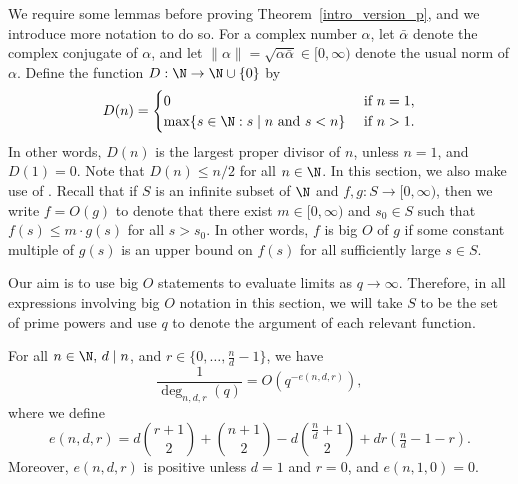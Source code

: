 We require some lemmas before proving Theorem~\ref{intro_version_p}, and we introduce more notation to do so.
For a complex number \(\alpha\), let \(\bar{\alpha}\) denote the complex conjugate of \(\alpha\), and let \(\| \alpha \| = \sqrt{\alpha \bar{\alpha}} \in [0,\infty)\) denote the usual norm of \(\alpha\).
Define the function \(D : \N \to \N \cup \{0\}\) by
\begin{equation}
D(n) =
\begin{cases}
0 & \text{ if } n = 1, \\
\max \{ s \in \N : s \mid n \text{ and } s < n\} & \text{ if } n > 1.
\end{cases}
\end{equation}
In other words, \(D(n)\) is the largest proper divisor of \(n\), unless \(n = 1\), and \(D(1) = 0\).
Note that \(D(n) \leq n/2\) for all \(n \in \N\).
In this section, we also make use of .
Recall that if \(S\) is an infinite subset of \(\N\) and \(f,g : S \to [0,\infty)\), then we write \(f = O(g)\) to denote that there exist \(m \in [0,\infty)\) and \(s_0 \in S\) such that \(f(s) \leq m \cdot g(s)\) for all \(s > s_0\).
In other words, \(f\) is big \(O\) of \(g\) if some constant multiple of \(g(s)\) is an upper bound on \(f(s)\) for all sufficiently large \(s \in S\).

\begin{remark}
	Our aim is to use big \(O\) statements to evaluate limits as \(q \to \infty\).
	Therefore, in all expressions involving big \(O\) notation in this section, we will take \(S\) to be the set of prime powers and use \(q\) to denote the argument of each relevant function.
\end{remark}


\begin{lemma}
\label{degree_limit_lemma}
For all \(n \in \N, \, d \mid n\), and \(r \in \{0,\ldots,\tfrac{n}{d}-1\}\), we have
\begin{equation}
\frac{1}{\deg_{n,d,r} (q)}
=
O \left (
q^{-e(n,d,r)}
\right ),
\end{equation}
where we define
\begin{equation}
\label{definition_of_e}
e(n,d,r)
=
d\binom{r+1}{2} + \binom{n+1}{2} - d\binom{\tfrac{n}{d} + 1}{2} + dr\left ( \tfrac{n}{d}-1-r \right ).
\end{equation}
Moreover, \(e(n,d,r)\) is positive unless \(d = 1\) and \(r = 0\), and \(e(n,1,0) = 0\).
\end{lemma}

